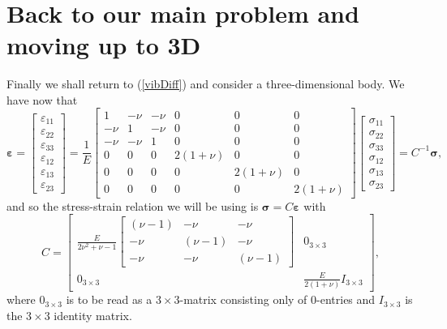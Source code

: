 \documentclass[paper=a4, fontsize=11pt]{scrartcl} %
\begin{document}
\section*{Back to our main problem and moving up to 3D}
Finally we shall return to (\ref{vibDiff}) and consider a three-dimensional body. We have now that 
\begin{equation*}
\boldsymbol{\varepsilon} = 
\begin{bmatrix}
\varepsilon_{11} \\
\varepsilon_{22} \\
\varepsilon_{33} \\
\varepsilon_{12} \\
\varepsilon_{13} \\
\varepsilon_{23}
\end{bmatrix}
= \frac{1}{E}\begin{bmatrix}
1 & -\nu & -\nu & 0 & 0 & 0 \\
-\nu & 1 & -\nu & 0 & 0 & 0 \\
-\nu & -\nu & 1 & 0 & 0 & 0 \\
0 & 0 & 0 & 2(1+\nu) & 0 & 0 \\
0 & 0 & 0 & 0 & 2(1+\nu) & 0 \\
0 & 0 & 0 & 0 & 0 & 2(1+\nu)
\end{bmatrix}
\begin{bmatrix}
\sigma_{11} \\ \sigma_{22} \\ \sigma_{33} \\ \sigma_{12} \\ \sigma_{13} \\ \sigma_{23}
\end{bmatrix}
= C^{-1}\boldsymbol{\sigma},
\end{equation*}
 and so the stress-strain relation we will be using is $\boldsymbol{\sigma} = C\boldsymbol{\varepsilon}$ with
\begin{equation*}
C =
\begin{bmatrix}
\frac{E}{2\nu^2+\nu-1}\begin{bmatrix}
(\nu -1) & -\nu & -\nu \\
-\nu & (\nu-1) & -\nu \\
-\nu & -\nu & (\nu-1)
\end{bmatrix}
&
0_{3\times 3} \\
0_{3\times 3} &
\frac{E}{2(1+\nu)}I_{3\times 3}
\end{bmatrix},
\end{equation*}
where $0_{3\times 3}$ is to be read as a $3\times 3$-matrix consisting only of $0$-entries and $I_{3\times 3}$ is the $3\times 3$ identity matrix.
\end{document}
